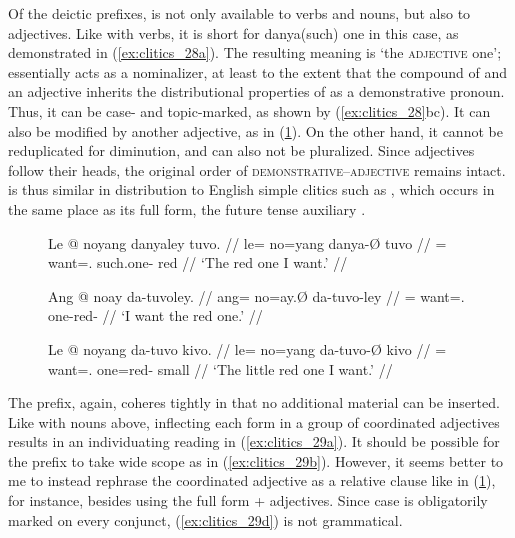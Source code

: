 \label{clitics_preadj_da}
Of the deictic prefixes,  is not only available to verbs and
nouns, but also to adjectives. Like with verbs, it is short for 
{danya}{(such) one} in this case, as demonstrated in (\ref{ex:clitics_28a}).
The resulting meaning is `the \textsc{adjective} one'; 
essentially acts as a nominalizer, at least to the extent that the compound of
 and an adjective inherits the distributional properties of
 as a demonstrative pronoun. Thus, it can be case- and 
topic-marked, as shown by (\ref{ex:clitics_28}bc). It can also be modified by
another adjective, as in (\ref{ex:clitics_28c}). On the other hand, it cannot
be reduplicated for diminution, and can also not be pluralized. Since
adjectives follow their heads, the original order of
\textsc{demonstrative}--\textsc{adjective} remains intact.  is
thus similar in distribution to English simple clitics such as , which
occurs in the same place as its full form, the future tense auxiliary
.

\begin{figure}[h]
\pex\label{ex:clitics_28}
\a\label{ex:clitics_28a}\begingl
	\gla Le @ noyang danyaley tuvo. //
	\glb le= no=yang danya-Ø tuvo //
	\glc \PatTI{}= want=\Fsg{}.\Aarg{} such.one-\Top{} red //
	\glft `The red one I want.' //
\endgl

\a\label{ex:clitics_28b}\begingl
	\gla Ang @ noay da-tuvoley. //
	\glb ang= no=ay.Ø da-tuvo-ley //
	\glc \AgtT{}= want=\Fsg{}.\Top{} one-red-\PargI{} //
	\glft `I want the red one.' //
\endgl

\a\label{ex:clitics_28c}\begingl
	\gla Le @ noyang da-tuvo kivo. //
	\glb le= no=yang da-tuvo-Ø kivo //
	\glc \PatTI{}= want=\Fsg{}.\Aarg{} one=red-\Top{} small //
	\glft `The little red one I want.' //
\endgl
\xe
\end{figure}

The prefix, again, coheres tightly in that no additional material can be
inserted. Like with nouns above, inflecting each form in a group of coordinated
adjectives results in an individuating reading in (\ref{ex:clitics_29a}). It
should be possible for the prefix to take wide scope as in
(\ref{ex:clitics_29b}). However, it seems better to me to instead rephrase the
coordinated adjective as a relative clause like in (\ref{ex:clitics_28c}), for
instance, besides using the full form  + adjectives. Since
case is obligatorily marked on every conjunct, (\ref{ex:clitics_29d}) is not
grammatical.

